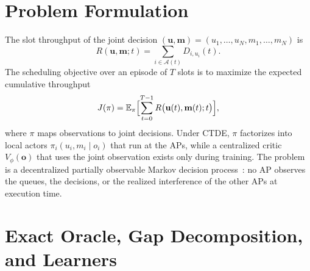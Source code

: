 \documentclass{ieeeaccess}
\begin{document}
\section{Problem Formulation}
\label{sec:problem}
The slot throughput of the joint decision $(\mathbf{u}, \mathbf{m}) = (u_1,\dots,u_N,m_1,\dots,m_N)$ is
\begin{equation}
R(\mathbf{u}, \mathbf{m}; t) = \sum_{i \in \mathcal{A}(t)} D_{i,u_i}(t).
\label{eq:slot_throughput}
\end{equation}
The scheduling objective over an episode of $T$ slots is to maximize the expected cumulative throughput
\begin{equation}
J(\pi) = \mathbb{E}_{\pi}\Bigl[\sum_{t=0}^{T-1} R\bigl(\mathbf{u}(t), \mathbf{m}(t); t\bigr)\Bigr],
\label{eq:objective}
\end{equation}
where $\pi$ maps observations to joint decisions. Under CTDE, $\pi$ factorizes into local actors $\pi_i(u_i, m_i \mid o_i)$ that run at the APs, while a centralized critic $V_\phi(\mathbf{o})$ that uses the joint observation exists only during training. The problem is a decentralized partially observable Markov decision process~\cite{oliehoek2016dec}: no AP observes the queues, the decisions, or the realized interference of the other APs at execution time.

\section{Exact Oracle, Gap Decomposition, and Learners}
\label{sec:method}
\end{document}
